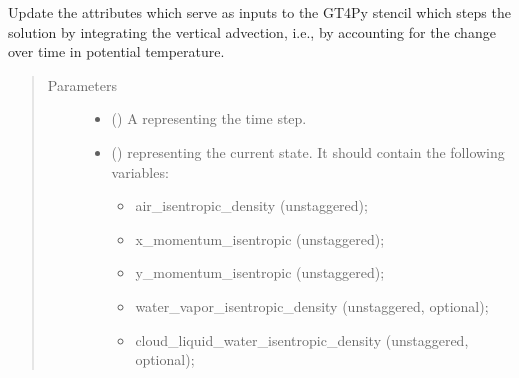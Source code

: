 \documentclass[letterpaper,10pt,english]{sphinxmanual}
\begin{document}
\begin{fulllineitems}
\begin{fulllineitems}
\begin{quote}
\begin{description}
\begin{itemize}
\end{itemize}


\end{description}\end{quote}

\end{fulllineitems}


\begin{fulllineitems}
\label{\detokenize{api:dycore.prognostic_isentropic.PrognosticIsentropic._stencil_stepping_by_coupling_physics_with_dynamics_set_inputs}}
Update the attributes which serve as inputs to the GT4Py stencil which steps the solution
by integrating the vertical advection, i.e., by accounting for the change over time in potential temperature.
\begin{quote}\begin{description}
\item[{Parameters}] \leavevmode\begin{itemize}
\item {} 
 () \textendash{} A  representing the time step.

\item {} 
 () \textendash{} 
{\hyperref[\detokenize{api:storages.state_isentropic.StateIsentropic}]{}} representing the current state.
It should contain the following variables:
\begin{itemize}
\item {} 
air\_isentropic\_density (unstaggered);

\item {} 
x\_momentum\_isentropic (unstaggered);

\item {} 
y\_momentum\_isentropic (unstaggered);

\item {} 
water\_vapor\_isentropic\_density (unstaggered, optional);

\item {} 
cloud\_liquid\_water\_isentropic\_density (unstaggered, optional);


\end{itemize}
\end{itemize}
\end{description}
\end{quote}
\end{fulllineitems}
\end{fulllineitems}
\end{document}
